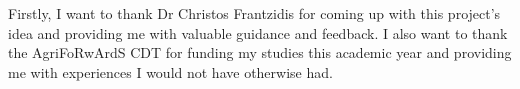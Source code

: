 \begin{acknowledgements}
    Firstly, I want to thank Dr Christos Frantzidis for coming up with this project's idea and providing me with valuable guidance and feedback. I also want to thank the AgriFoRwArdS CDT for funding my studies this academic year and providing me with experiences I would not have otherwise had.
\end{acknowledgements}